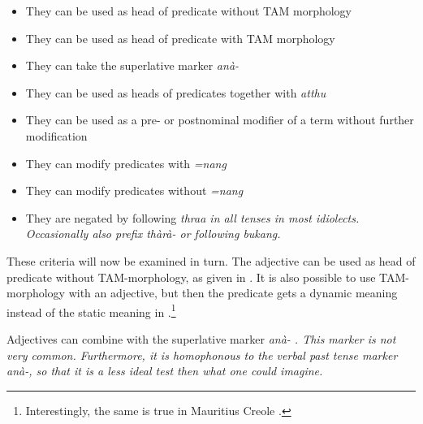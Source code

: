 \begin{itemize}
	\item They can be used as head of predicate without TAM morphology
	\item They can be used as head of predicate  with TAM morphology
	\item They can take the superlative marker \em anà-\em
	\item They can be used as heads of predicates  together with \em atthu\em
	\item They can be used as a pre- or postnominal modifier of a term without further modification
	\item They can modify predicates with  \em =nang \em
	\item They can modify predicates  without \em =nang \em
	\item They are negated by following \em thraa \em in all tenses in most idiolects. Occasionally also prefix \em thàrà- \em or following \em bukang\em.
\end{itemize}

These criteria will now be examined in turn. The adjective can be used as head of predicate without TAM-morphology, as given in . It is also possible to use TAM-morphology with an adjective, but then the predicate gets a dynamic meaning  instead of the static meaning in .\footnote{Interestingly, the same is true in Mauritius Creole \citep[131]{Alleyne2000}.}






Adjectives can combine with the superlative marker \em anà- \em {}. This marker is not very common. Furthermore, it is homophonous to the verbal past tense marker \em anà-\em, so that it is a less ideal test then what one could imagine.

